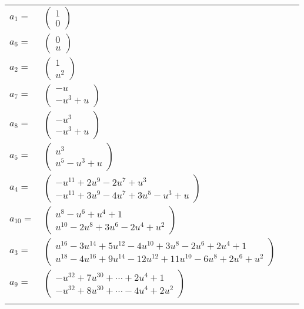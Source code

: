 \documentclass[1p]{elsarticle_modified}
\theoremstyle{definition}
\begin{document}
\begin{tabular}{m{7pt} m{180pt} m{7pt} m{180pt} }
\flushright $a_{1}=$&$\begin{pmatrix}1\\0\end{pmatrix}$ \\
\flushright $a_{6}=$&$\begin{pmatrix}0\\u\end{pmatrix}$ \\
\flushright $a_{2}=$&$\begin{pmatrix}1\\u^2\end{pmatrix}$ \\
\flushright $a_{7}=$&$\begin{pmatrix}- u\\- u^3+u\end{pmatrix}$ \\
\flushright $a_{8}=$&$\begin{pmatrix}- u^3\\- u^3+u\end{pmatrix}$ \\
\flushright $a_{5}=$&$\begin{pmatrix}u^3\\u^5- u^3+u\end{pmatrix}$ \\
\flushright $a_{4}=$&$\begin{pmatrix}- u^{11}+2 u^9-2 u^7+u^3\\- u^{11}+3 u^9-4 u^7+3 u^5- u^3+u\end{pmatrix}$ \\
\flushright $a_{10}=$&$\begin{pmatrix}u^8- u^6+u^4+1\\u^{10}-2 u^8+3 u^6-2 u^4+u^2\end{pmatrix}$ \\
\flushright $a_{3}=$&$\begin{pmatrix}u^{16}-3 u^{14}+5 u^{12}-4 u^{10}+3 u^8-2 u^6+2 u^4+1\\u^{18}-4 u^{16}+9 u^{14}-12 u^{12}+11 u^{10}-6 u^8+2 u^6+u^2\end{pmatrix}$ \\
\flushright $a_{9}=$&$\begin{pmatrix}- u^{32}+7 u^{30}+\cdots+2 u^4+1\\- u^{32}+8 u^{30}+\cdots-4 u^4+2 u^2\end{pmatrix}$\\&\end{tabular}
\end{document}
